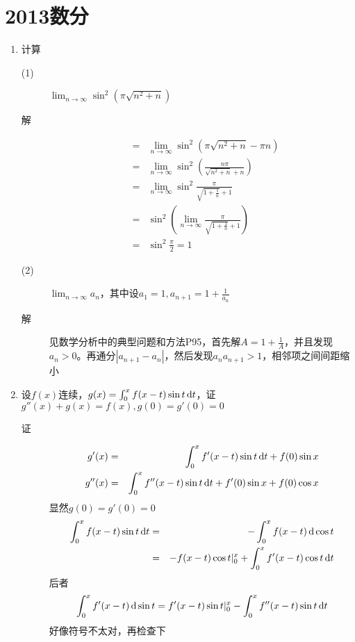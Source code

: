 \section{2013数分}
\begin{enumerate}
\item 计算
\begin{description}
\item[(1)] $\lim_{n\to \infty} \sin^2(\pi\sqrt{n^2+n})$
\item[解]
\begin{eqnarray*}
&=& \lim_{n\to \infty}\sin^2(\pi\sqrt{n^2+n}-\pi n)\\
&=& \lim_{n\to \infty}\sin^2\left(\frac{n\pi}{\sqrt{n^2+n}+n} \right)\\
&=& \lim_{n\to \infty}\sin^2\frac{\pi}{\sqrt{1+\frac{1}{n}}+1}\\
& =& \sin^2 \left(\lim_{n\to \infty}\frac{\pi}{\sqrt{1+\frac{1}{n}}+1}\right)\\
&=& \sin^2\frac{\pi}{2} = 1
\end{eqnarray*}

\item[(2)] $\lim_{n\to \infty} a_n$，其中设$a_1=1,a_{n+1}=1+\frac{1}{a_n}$
\item[解] 见数学分析中的典型问题和方法P95，首先解$A=1+\frac{1}{A}$，并且发现$a_n>0$。再通分$|a_{n+1}-a_n|$，然后发现$a_na_{n+1}>1$，相邻项之间间距缩小
\end{description}

\item 设$f(x)$连续，$g(x)=\int_0^x f(x-t)\sin t\,\mathrm{d} t$，证$g''(x)+g(x)=f(x),g(0)=g'(0)=0$
\begin{description}
\item[证]
\begin{eqnarray*}
g'(x) &=& \int_0^x f'(x-t)\sin t\,\mathrm{d} t + f(0)\sin x\\
g''(x) &=& \int_0^x f''(x-t)\sin t\,\mathrm{d} t + f'(0)\sin x + f(0)\cos x\\
\end{eqnarray*}
显然$g(0)=g'(0)=0$
\begin{eqnarray*}
\int_0^x f(x-t)\sin t\,\mathrm{d} t &=& -\int_0^x f(x-t)\,\mathrm{d} \cos t \\
&=& - f(x-t) \cos t |_0^x + \int_0^x f'(x-t) \cos t \,\mathrm{d} t\\
\end{eqnarray*}
后者
\begin{eqnarray*}
\int_0^x f'(x-t)\,\mathrm{d} \sin t = f'(x-t) \sin t |_0^x - \int_0^x f''(x-t) \sin t \,\mathrm{d} t
\end{eqnarray*}
好像符号不太对，再检查下
\end{description}


\end{enumerate}
